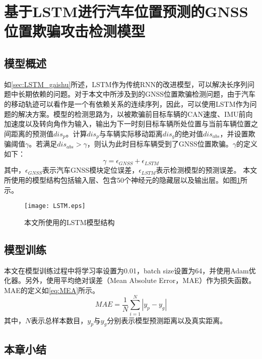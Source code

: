 \section{基于LSTM进行汽车位置预测的GNSS位置欺骗攻击检测模型}
\subsection{模型概述}
如\ref{sec:LSTM_gaishu}所述，LSTM作为传统RNN的改进模型，可以解决长序列问题中长期依赖的问题。对于本文中所涉及到的GNSS位置欺骗检测问题，由于汽车的移动轨迹可以看作是一个有依赖关系的连续序列，因此，可以使用LSTM作为问题的解决方案。模型的检测思路为，以被欺骗前目标车辆的CAN速度、IMU前向加速度以及转向角作为输入，输出为下一时刻目标车辆所处位置与当前车辆位置之间距离的预测值$dis_p$。计算$dis_p$与车辆实际移动距离$dis_g$的绝对值$dis_{abs}$，并设置欺骗阈值$\gamma$。若满足$dis_{abs}>\gamma$，则认为此时目标车辆受到了GNSS位置欺骗。$\gamma$的定义如下：
\begin{equation}
    \gamma=\epsilon_{GNSS}+\epsilon_{LSTM}
    \label{eq:gamma}
\end{equation}
其中，$\epsilon_{GNSS}$表示汽车GNSS模块定位误差，$\epsilon_{LSTM}$表示检测模型的预测误差。
本文所使用的模型结构包括输入层、包含50个神经元的隐藏层以及输出层。如图\ref{fig:my_model_arch}所示。
\begin{figure}[htbp]
    \begin{center}
        \texttt{[image: LSTM.eps]}
    \end{center}
    \caption{本文所使用的LSTM模型结构}
    \label{fig:my_model_arch}
\end{figure}

\subsection{模型训练}
本文在模型训练过程中将学习率设置为0.01，batch size设置为64，并使用Adam优化器。另外，使用平均绝对误差（Mean Absolute Error，MAE）作为损失函数。MAE的定义如\ref{eq:MEA}所示。
\begin{equation}
    MAE=\frac{1}{N}\sum_{i=1}^N|y_p-y_g|
    \label{eq:MAE}
\end{equation}
其中，$N$表示总样本数目，$y_p$与$y_g$分别表示模型预测距离以及真实距离。
\subsection{本章小结}
